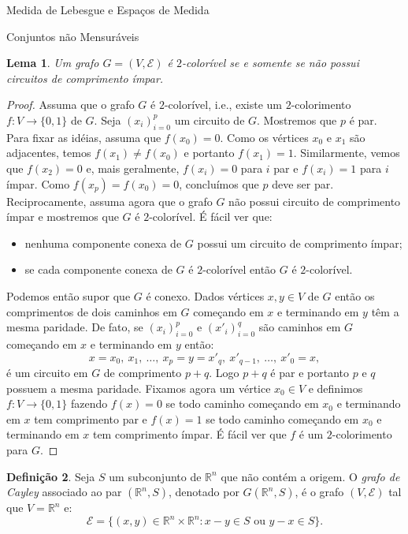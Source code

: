 \documentclass[oneside,final,11pt]{amsbook}
\newcommand{\R}{\mathds R}
\theoremstyle{remark}\newtheorem{exercise}{Exercício}[chapter]
\theoremstyle{remark}\newtheorem{*exercise}[exercise]{\hbox to 0pt{\hskip 0pt minus 1fil*}Exercício}
\theoremstyle{definition}\newtheorem{exdefin}{Definição}[chapter]
\theoremstyle{plain}\newtheorem{teo}{Teorema}[section]
\theoremstyle{plain}\newtheorem{lem}[teo]{Lema}
\theoremstyle{plain}\newtheorem{prop}[teo]{Proposição}
\theoremstyle{plain}\newtheorem{cor}[teo]{Corolário}
\theoremstyle{definition}\newtheorem{defin}[teo]{Definição}
\theoremstyle{remark}\newtheorem{rem}[teo]{Observação}
\theoremstyle{definition}\newtheorem{notation}[teo]{Notação}
\theoremstyle{definition}\newtheorem{convention}[teo]{Convenção}
\theoremstyle{definition}\newtheorem{example}[teo]{Exemplo}
\numberwithin{section}{chapter}
\numberwithin{equation}{section}
\begin{document}
\begin{chapter}{Medida de Lebesgue e Espaços de Medida}
\begin{section}{Conjuntos não Mensuráveis}
\begin{lem}\label{thm:circuitoimpar}
Um grafo $G=(V,\mathcal E)$ é $2$-colorível se e somente se não possui circuitos de comprimento
ímpar.
\end{lem}
\begin{proof}
Assuma que o grafo $G$ é $2$-colorível, i.e., existe um $2$-colorimento $f:V\to\{0,1\}$ de $G$.
Seja $(x_i)_{i=0}^p$ um circuito de $G$.
Mostremos que $p$ é par. Para fixar as idéias, assuma que $f(x_0)=0$. Como os vértices $x_0$ e $x_1$
são adjacentes, temos $f(x_1)\ne f(x_0)$ e portanto $f(x_1)=1$. Similarmente, vemos que $f(x_2)=0$ e, mais geralmente,
$f(x_i)=0$ para $i$ par e $f(x_i)=1$ para $i$ ímpar. Como $f(x_p)=f(x_0)=0$, concluímos que
$p$ deve ser par. Reciprocamente, assuma agora que o grafo $G$ não possui circuito de comprimento
ímpar e mostremos que $G$ é $2$-colorível. É fácil ver que:
\begin{itemize}
\item nenhuma componente conexa de $G$ possui um circuito de comprimento ímpar;
\item se cada componente conexa de $G$ é $2$-colorível então $G$ é $2$-colorível.
\end{itemize}
Podemos então supor que $G$ é conexo. Dados vértices $x,y\in V$ de $G$ então os comprimentos
de dois caminhos em $G$ começando em $x$ e terminando em $y$ têm a mesma paridade. De fato,
se $(x_i)_{i=0}^p$ e $(x'_i)_{i=0}^q$ são caminhos em $G$ começando em $x$ e terminando em $y$
então:
\[x=x_0,\ x_1,\ \ldots,\ x_p=y=x'_q,\ x'_{q-1},\ \ldots,\ x'_0=x,\]
é um circuito em $G$ de comprimento $p+q$. Logo $p+q$ é par e portanto $p$ e $q$ possuem
a mesma paridade. Fixamos agora um vértice $x_0\in V$ e definimos $f:V\to\{0,1\}$ fazendo
$f(x)=0$ se todo caminho começando em $x_0$ e terminando em $x$ tem comprimento par e $f(x)=1$
se todo caminho começando em $x_0$ e terminando em $x$ tem comprimento ímpar. É fácil ver que
$f$ é um $2$-colorimento para $G$.
\end{proof}

\begin{defin}
Seja $S$ um subconjunto de $\R^n$ que não contém a origem. O {\em grafo de Cayley\/}
associado ao par $(\R^n,S)$, denotado por $G(\R^n,S)$\index[simbolos]{$G(\R^n,S)$}, é o grafo $(V,\mathcal E)$
tal que $V=\R^n$ e:
\[\mathcal E=\big\{(x,y)\in\R^n\times\R^n:\text{$x-y\in S$ ou $y-x\in S$}\big\}.\]
\end{defin}


\end{section}
\end{chapter}
\end{document}
